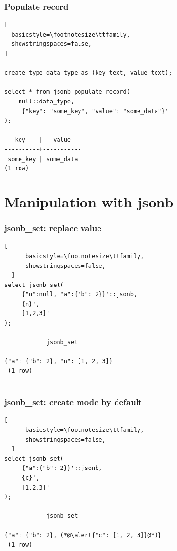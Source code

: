 \documentclass[14pt, compress, aspectratio=169]{beamer}
\begin{document}
\begin{frame}[fragile]
  \frametitle{Populate record}

\begin{lstlisting}[
  basicstyle=\footnotesize\ttfamily,
  showstringspaces=false,
]

create type data_type as (key text, value text);

select * from jsonb_populate_record(
    null::data_type,
    '{"key": "some_key", "value": "some_data"}'
);

   key    |   value   
----------+-----------
 some_key | some_data
(1 row)

\end{lstlisting}

\end{frame}


\section{Manipulation with jsonb}

\begin{frame}[fragile]
  \frametitle{jsonb\_set: replace value}

  \begin{lstlisting}[
      basicstyle=\footnotesize\ttfamily,
      showstringspaces=false,
  ]
select jsonb_set(
    '{"n":null, "a":{"b": 2}}'::jsonb,
    '{n}',
    '[1,2,3]'
);

            jsonb_set                                 
-------------------------------------
{"a": {"b": 2}, "n": [1, 2, 3]}
 (1 row)
 
  \end{lstlisting}

\end{frame}

\begin{frame}[fragile]
  \frametitle{jsonb\_set: create mode by default}

  \begin{lstlisting}[
      basicstyle=\footnotesize\ttfamily,
      showstringspaces=false,
  ]
select jsonb_set(
    '{"a":{"b": 2}}'::jsonb,
    '{c}',
    '[1,2,3]'
);

            jsonb_set                                 
-------------------------------------
{"a": {"b": 2}, (*@\alert{"c": [1, 2, 3]}@*)}
 (1 row)
 
  \end{lstlisting}

\end{frame}
\end{document}
